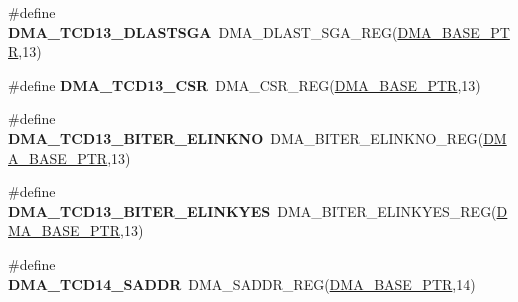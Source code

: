 \begin{DoxyCompactItemize}
\item 
\hypertarget{group___d_m_a___register___accessor___macros_ga53a2172bba17c20b89978635f9cad33c}{}\#define {\bfseries D\+M\+A\+\_\+\+T\+C\+D13\+\_\+\+D\+L\+A\+S\+T\+S\+G\+A}~D\+M\+A\+\_\+\+D\+L\+A\+S\+T\+\_\+\+S\+G\+A\+\_\+\+R\+E\+G(\hyperlink{group___d_m_a___peripheral_ga6997fbc1b1973e9f27170217a3bd6f22}{D\+M\+A\+\_\+\+B\+A\+S\+E\+\_\+\+P\+T\+R},13)\label{group___d_m_a___register___accessor___macros_ga53a2172bba17c20b89978635f9cad33c}

\item 
\hypertarget{group___d_m_a___register___accessor___macros_ga57278ea64ab9f974531a4ee3c57797c6}{}\#define {\bfseries D\+M\+A\+\_\+\+T\+C\+D13\+\_\+\+C\+S\+R}~D\+M\+A\+\_\+\+C\+S\+R\+\_\+\+R\+E\+G(\hyperlink{group___d_m_a___peripheral_ga6997fbc1b1973e9f27170217a3bd6f22}{D\+M\+A\+\_\+\+B\+A\+S\+E\+\_\+\+P\+T\+R},13)\label{group___d_m_a___register___accessor___macros_ga57278ea64ab9f974531a4ee3c57797c6}

\item 
\hypertarget{group___d_m_a___register___accessor___macros_gaf8d3d5de90640cb72376b1a659fa622b}{}\#define {\bfseries D\+M\+A\+\_\+\+T\+C\+D13\+\_\+\+B\+I\+T\+E\+R\+\_\+\+E\+L\+I\+N\+K\+N\+O}~D\+M\+A\+\_\+\+B\+I\+T\+E\+R\+\_\+\+E\+L\+I\+N\+K\+N\+O\+\_\+\+R\+E\+G(\hyperlink{group___d_m_a___peripheral_ga6997fbc1b1973e9f27170217a3bd6f22}{D\+M\+A\+\_\+\+B\+A\+S\+E\+\_\+\+P\+T\+R},13)\label{group___d_m_a___register___accessor___macros_gaf8d3d5de90640cb72376b1a659fa622b}

\item 
\hypertarget{group___d_m_a___register___accessor___macros_gac91e49de86dc4e5b073510648adce3b3}{}\#define {\bfseries D\+M\+A\+\_\+\+T\+C\+D13\+\_\+\+B\+I\+T\+E\+R\+\_\+\+E\+L\+I\+N\+K\+Y\+E\+S}~D\+M\+A\+\_\+\+B\+I\+T\+E\+R\+\_\+\+E\+L\+I\+N\+K\+Y\+E\+S\+\_\+\+R\+E\+G(\hyperlink{group___d_m_a___peripheral_ga6997fbc1b1973e9f27170217a3bd6f22}{D\+M\+A\+\_\+\+B\+A\+S\+E\+\_\+\+P\+T\+R},13)\label{group___d_m_a___register___accessor___macros_gac91e49de86dc4e5b073510648adce3b3}

\item 
\hypertarget{group___d_m_a___register___accessor___macros_ga3ef5e2430d4e4dab34edc5e8767d0e46}{}\#define {\bfseries D\+M\+A\+\_\+\+T\+C\+D14\+\_\+\+S\+A\+D\+D\+R}~D\+M\+A\+\_\+\+S\+A\+D\+D\+R\+\_\+\+R\+E\+G(\hyperlink{group___d_m_a___peripheral_ga6997fbc1b1973e9f27170217a3bd6f22}{D\+M\+A\+\_\+\+B\+A\+S\+E\+\_\+\+P\+T\+R},14)\label{group___d_m_a___register___accessor___macros_ga3ef5e2430d4e4dab34edc5e8767d0e46}


\end{DoxyCompactItemize}
